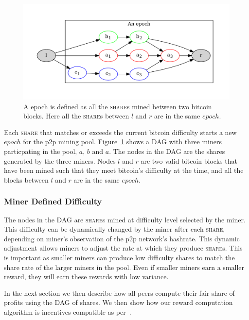 \documentclass{article}
\begin{document}
\begin{figure}
  \includegraphics[width=1.0\textwidth]{epoch}
  \caption{A epoch is defined as all the \textsc{share}s mined between two
    bitcoin blocks. Here all the \textsc{share}s between $l$ and $r$ are in
    the same $epoch$.}\label{fig:epoch}
\end{figure}

Each \textsc{share} that matches or exceeds the current bitcoin
difficulty starts a new $epoch$ for the p2p mining
pool. Figure~\ref{fig:epoch} shows a DAG with three miners
particpating in the pool, $a$, $b$ and $a$. The nodes in the DAG are
the shares generated by the three miners. Nodes $l$ and $r$ are two
valid bitcoin blocks that have been mined such that they meet
bitcoin's difficulty at the time, and all the blocks between $l$ and
$r$ are in the same $epoch$.

\subsubsection{Miner Defined Difficulty}\label{sec:share-difficulty}

The nodes in the DAG are \textsc{share}s mined at difficulty level
selected by the miner. This difficulty can be dynamically changed by
the miner after each \textsc{share}, depending on miner's observation
of the p2p network's hashrate. This dynamic adjustment allows miners
to adjust the rate at which they produce \textsc{share}s. This is
important as smaller miners can produce low difficulty shares to match
the share rate of the larger miners in the pool. Even if smaller
miners earn a smaller reward, they will earn these rewards with low
variance.

In the next section we then describe how all peers compute their fair
share of profits using the DAG of shares. We then show how our reward
computation algorithm is incentives
compatible as per~\cite{incentives-compatible}.
\end{document}
